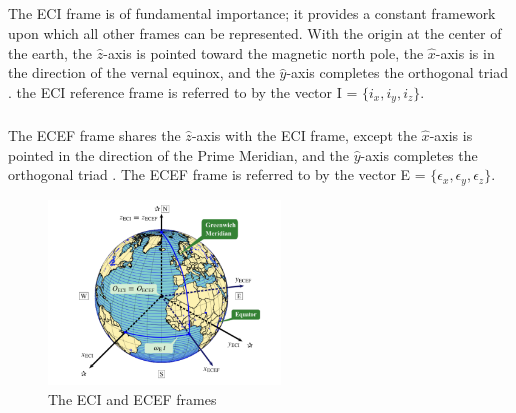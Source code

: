 \documentclass{article}
\begin{document}
\subsection{\color{black}{Reference Frames}}

\subsubsection{\color{black}{Earth-Centered Inertial (ECI) Frame}}

The ECI frame is of fundamental importance; it provides a constant framework upon which all other frames can be represented. With the origin at the center of the earth, the $\hat{z}$-axis is pointed toward the magnetic north pole, the $\hat{x}$-axis is in the direction of the vernal equinox, and the $\hat{y}$-axis completes the orthogonal triad \cite{vos}. the ECI reference frame is referred to by the vector I = $\{i_{x}, i_{y}, i_{z}\}$.

\subsubsection{\color{black}{Earth-Centered Earth-Fixed (ECEF) Frame}}

The ECEF frame shares the $\hat{z}$-axis with the ECI frame, except the $\hat{x}$-axis is pointed in the direction of the Prime Meridian, and the $\hat{y}$-axis completes the orthogonal triad \cite{vos}. The ECEF frame is referred to by the vector E = $\{\epsilon_{x}, \epsilon_{y}, \epsilon_{z}\}$.

\begin{figure}[H]
    \centering
    \includegraphics[width=0.55\textwidth]{ECI and ECEF Frame.png}
    \caption{The ECI and ECEF frames \cite{vos}}
    \label{fig:enter-label}
\end{figure}

\subsubsection{\color{black}{Orbital (O) Frame}}
\end{document}
